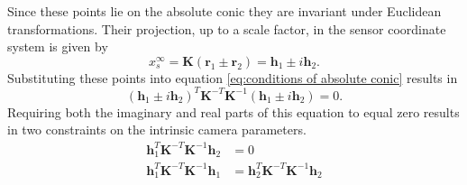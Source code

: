 Since these points lie on the absolute conic they are invariant under Euclidean transformations. Their projection, up to a scale factor, in the sensor coordinate system is given by
\begin{equation}
	x_s^{\infty} = \bm{K} \left( \bm{r}_1 \pm \bm{r}_2 \right) = \bm{h}_1 \pm i \bm{h}_2.
\end{equation}
Substituting these points into equation \ref{eq:conditions of absolute conic} results in
\begin{equation}
	\left( \bm{h}_1 \pm i \bm{h}_2 \right)^T \bm{K}^{-T} \bm{K}^{-1} \left( \bm{h}_1 \pm i \bm{h}_2 \right) = 0.
\end{equation}
Requiring both the imaginary and real parts of this equation to equal zero results in two constraints on the intrinsic camera parameters.
\begin{align}
\label{eq:intrinsic constraints}
	\bm{h}_1^T \bm{K}^{-T} \bm{K}^{-1} \bm{h}_2 &= 0 \\
	\bm{h}_1^T \bm{K}^{-T} \bm{K}^{-1} \bm{h}_1 &= \bm{h}_2^T \bm{K}^{-T} \bm{K}^{-1} \bm{h}_2
\end{align}

